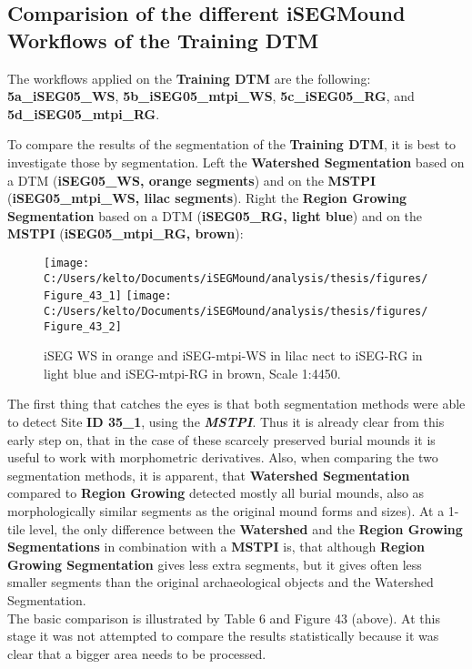 \documentclass[
  12pt,
]{article}
\begin{document}
\hypertarget{comparision-of-the-different-isegmound-workflows-of-the-training-dtm}{%
\subsection{\texorpdfstring{\textbf{Comparision of the different iSEGMound Workflows of the Training DTM}}{Comparision of the different iSEGMound Workflows of the Training DTM}}\label{comparision-of-the-different-isegmound-workflows-of-the-training-dtm}}

The workflows applied on the \textbf{Training DTM} are the following:
\newline
\textbf{5a\_iSEG05\_WS}, \textbf{5b\_iSEG05\_mtpi\_WS}, \textbf{5c\_iSEG05\_RG}, and \textbf{5d\_iSEG05\_mtpi\_RG}.

To compare the results of the segmentation of the \textbf{Training DTM}, it is best to investigate those by segmentation. Left the \textbf{Watershed Segmentation} based on a DTM (\textbf{iSEG05\_WS, orange segments}) and on the \textbf{MSTPI} (\textbf{iSEG05\_mtpi\_WS, lilac segments}). Right the \textbf{Region Growing Segmentation} based on a DTM (\textbf{iSEG05\_RG, light blue}) and on the \textbf{MSTPI} (\textbf{iSEG05\_mtpi\_RG, brown}):

\begin{figure}
\texttt{[image: C:/Users/kelto/Documents/iSEGMound/analysis/thesis/figures/Figure\_43\_1]} \texttt{[image: C:/Users/kelto/Documents/iSEGMound/analysis/thesis/figures/Figure\_43\_2]} \caption{iSEG WS in orange and iSEG-mtpi-WS in lilac nect to iSEG-RG in light blue and iSEG-mtpi-RG in brown, Scale 1:4450.}\label{fig:Figure43}
\end{figure}

The first thing that catches the eyes is that both segmentation methods were able to detect Site \textbf{ID 35\_1}, using the \textbf{\emph{MSTPI}}. Thus it is already clear from this early step on, that in the case of these scarcely preserved burial mounds it is useful to work with morphometric derivatives. Also, when comparing the two segmentation methods, it is apparent, that \textbf{Watershed Segmentation} compared to \textbf{Region Growing} detected mostly all burial mounds, also as morphologically similar segments as the original mound forms and sizes). At a 1-tile level, the only difference between the \textbf{Watershed} and the \textbf{Region Growing Segmentations} in combination with a \textbf{MSTPI} is, that although \textbf{Region Growing Segmentation} gives less extra segments, but it gives often less smaller segments than the original archaeological objects and the Watershed Segmentation.\\
The basic comparison is illustrated by Table 6 and Figure 43 (above). At this stage it was not attempted to compare the results statistically because it was clear that a bigger area needs to be processed.
\end{document}
